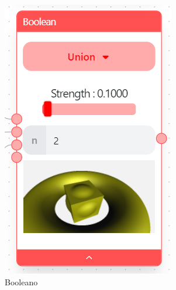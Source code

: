 \begin{figure}[!h]
\begin{subfigure}[b]{0.21\textwidth}
        \includegraphics[width=\textwidth]{Plantilla-TFG-master/img/nodo_bool.png}
        \caption{Booleano}
    \end{subfigure}
    \hspace{10pt}
    \begin{subfigure}[b]{0.21\textwidth}
        \centering

\end{subfigure}
\end{figure}
